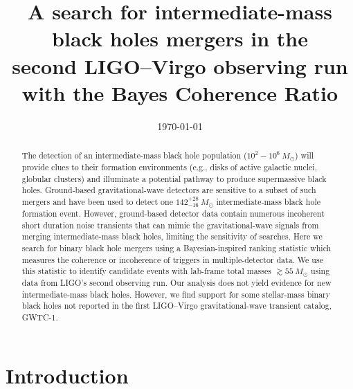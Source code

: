 \documentclass[
 nofootinbib,
 amsmath,amssymb,
 aps,
 twocolumn,
 superscriptaddress
]{revtex4-2}
\begin{document}
\title{A search for intermediate-mass black holes mergers in the \\second LIGO--Virgo observing run with the Bayes Coherence Ratio}




\date{\today}


\begin{abstract}
The detection of an intermediate-mass black hole population ($10^2-10^6\ M_\odot$) will provide clues to their formation environments (e.g., disks of active galactic nuclei, globular clusters) and illuminate a potential pathway to produce supermassive black holes. Ground-based gravitational-wave detectors are sensitive to a subset of such mergers and have been used to detect one $142^{+28}_{-16}\ M_\odot$ intermediate-mass black hole formation event. However, ground-based detector data contain numerous incoherent short duration noise transients that can mimic the gravitational-wave signals from merging intermediate-mass black holes, limiting the sensitivity of searches. Here we search for binary black hole mergers using a Bayesian-inspired ranking statistic which measures the coherence or incoherence of triggers in multiple-detector data. We use this statistic to identify candidate events with lab-frame total masses $\gtrsim55\ M_\odot$ using data from LIGO's second observing run. Our analysis does not yield evidence for new intermediate-mass black holes. However, we find support for some stellar-mass binary black holes not reported in the first LIGO--Virgo gravitational-wave transient catalog, GWTC-1.
\end{abstract}

\maketitle

\section{Introduction}
\end{document}
